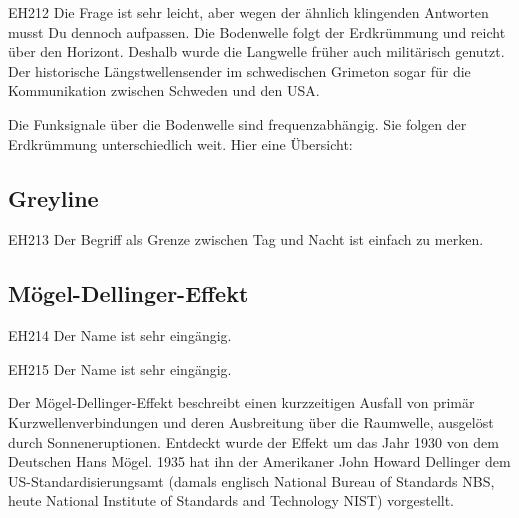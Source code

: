 \begin{sol}{EH212}
Die Frage ist sehr leicht, aber wegen der ähnlich klingenden Antworten musst Du dennoch aufpassen. Die Bodenwelle folgt der Erdkrümmung und reicht über den Horizont. Deshalb wurde die Langwelle früher auch militärisch genutzt. Der historische Längstwellensender im schwedischen Grimeton sogar für die Kommunikation zwischen Schweden und den USA.
\end{sol}

\begin{ohmchapter}
Die Funksignale über die Bodenwelle sind frequenzabhängig.
Sie folgen der Erdkrümmung unterschiedlich weit. Hier eine Übersicht:
\end{ohmchapter}  

\subsection{Greyline}

\begin{sol}{EH213}
Der Begriff  als Grenze zwischen Tag und Nacht ist einfach zu merken.
\end{sol}
\begin{ohmchapter}

\end{ohmchapter}  

\subsection{Mögel-Dellinger-Effekt}

\begin{sol}{EH214}
  Der Name  ist sehr eingängig.
\end{sol}
\begin{sol}{EH215}
  Der Name  ist sehr eingängig.
\end{sol}

\begin{ohmchapter}
Der Mögel-Dellinger-Effekt beschreibt einen kurzzeitigen Ausfall von primär Kurzwellenverbindungen und deren Ausbreitung über die Raumwelle, ausgelöst durch Sonneneruptionen. Entdeckt wurde der Effekt um das Jahr 1930 von dem Deutschen Hans Mögel. 1935 hat ihn der Amerikaner John Howard Dellinger dem US-Standardisierungsamt (damals englisch National Bureau of Standards NBS, heute National Institute of Standards and Technology NIST) vorgestellt.    
\end{ohmchapter}  

